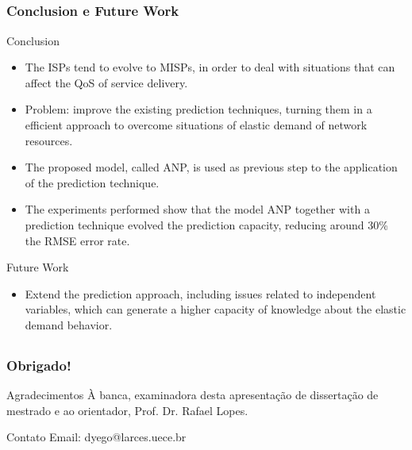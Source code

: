 \documentclass[aspectratio=169]{beamer}
\begin{document}

\subsection{}
\begin{frame}
\frametitle{Conclusion e Future Work}
\small
\begin{block}{Conclusion}
\begin{itemize} \small
\item The ISPs tend to evolve to MISPs, in order to deal with situations that can affect the QoS of service delivery.
\item Problem: improve the existing prediction techniques, turning them in a efficient approach to overcome situations of elastic demand of network resources.
\item The proposed model, called ANP, is used as previous step to the application of the prediction technique.
\item The experiments performed show that the model ANP together with a prediction technique evolved the prediction capacity, reducing around 30\% the RMSE error rate.
\end{itemize}
\end{block}

\begin{block}{Future Work}
\begin{itemize} \small
\item Extend the prediction approach, including issues related to independent variables, which can generate a higher capacity of knowledge about the elastic demand behavior.
\end{itemize}
\end{block}

\end{frame}



\subsection{}
\begin{frame}
\frametitle{Obrigado!}

\begin{block}{Agradecimentos}\small
À banca, examinadora desta apresentação de dissertação de mestrado e ao orientador, Prof. Dr. Rafael Lopes.


\end{block}

\begin{block}{Contato}\small
Email: dyego@larces.uece.br
\end{block}

\end{frame}
\end{document}
